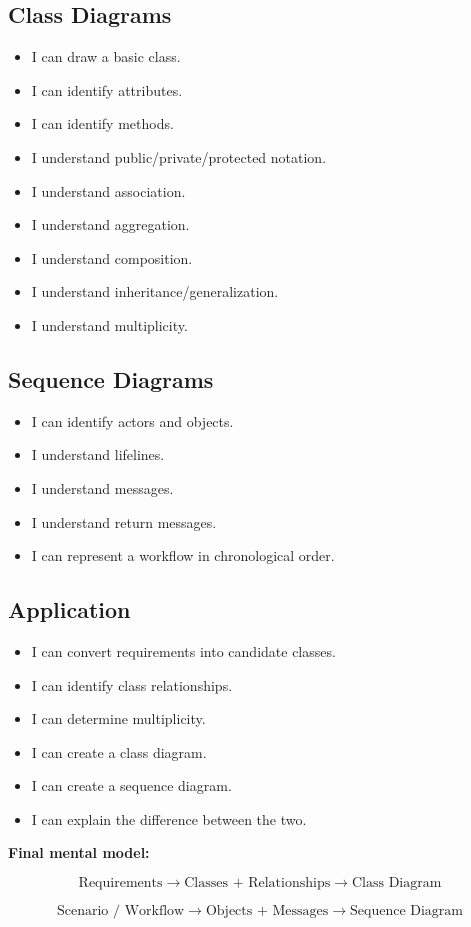 \documentclass[11pt,a4paper]{article}
\newcommand{\checkitem}{$\square$}
\begin{document}
\subsection*{Class Diagrams}

\begin{itemize}[label=\checkitem]
    \item I can draw a basic class.
    \item I can identify attributes.
    \item I can identify methods.
    \item I understand public/private/protected notation.
    \item I understand association.
    \item I understand aggregation.
    \item I understand composition.
    \item I understand inheritance/generalization.
    \item I understand multiplicity.
\end{itemize}

\subsection*{Sequence Diagrams}

\begin{itemize}[label=\checkitem]
    \item I can identify actors and objects.
    \item I understand lifelines.
    \item I understand messages.
    \item I understand return messages.
    \item I can represent a workflow in chronological order.
\end{itemize}

\subsection*{Application}

\begin{itemize}[label=\checkitem]
    \item I can convert requirements into candidate classes.
    \item I can identify class relationships.
    \item I can determine multiplicity.
    \item I can create a class diagram.
    \item I can create a sequence diagram.
    \item I can explain the difference between the two.
\end{itemize}

\begin{conceptbox}
\textbf{Final mental model:}

\[
\boxed{
\text{Requirements}
\rightarrow
\text{Classes + Relationships}
\rightarrow
\text{Class Diagram}
}
\]

\[
\boxed{
\text{Scenario / Workflow}
\rightarrow
\text{Objects + Messages}
\rightarrow
\text{Sequence Diagram}
}
\]
\end{conceptbox}
\end{document}
